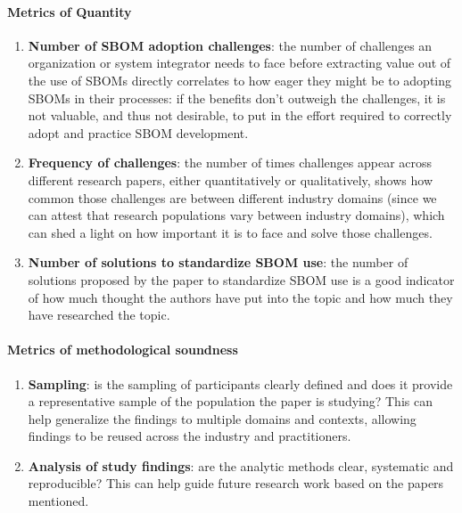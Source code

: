 \paragraph{Metrics of Quantity}
\begin{enumerate}
    \setcounter{enumi}{\value{metrics}}
    \item \textbf{Number of SBOM adoption challenges}: the number of challenges an organization or system integrator needs to face before extracting value out of the use of SBOMs directly correlates to how eager they might be to adopting SBOMs in their processes: if the benefits don't outweigh the challenges, it is not valuable, and thus not desirable, to put in the effort required to correctly adopt and practice SBOM development.
    \item \textbf{Frequency of challenges}: the number of times challenges appear across different research papers, either quantitatively or qualitatively, shows how common those challenges are between different industry domains (since we can attest that research populations vary between industry domains), which can shed a light on how important it is to face and solve those challenges.
    \item \textbf{Number of solutions to standardize SBOM use}: the number of solutions proposed by the paper to standardize SBOM use is a good indicator of how much thought the authors have put into the topic and how much they have researched the topic.
          \setcounter{metrics}{\value{enumi}}
\end{enumerate}

\paragraph{Metrics of methodological soundness}
\begin{enumerate}
    \setcounter{enumi}{\value{metrics}}
    \item \textbf{Sampling}: is the sampling of participants clearly defined and does it provide a representative sample of the population the paper is studying? This can help generalize the findings to multiple domains and contexts, allowing findings to be reused across the industry and practitioners.
    \item \textbf{Analysis of study findings}: are the analytic methods clear, systematic and reproducible? This can help guide future research work based on the papers mentioned.
          \setcounter{metrics}{\value{enumi}}
\end{enumerate}

